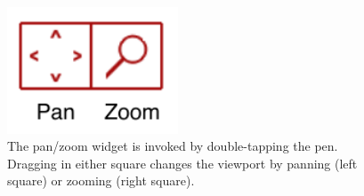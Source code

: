 \begin{figure}
  \centering
  \includegraphics[width=2in]{img/panzoom.pdf}
  \caption[Pan/Zoom Widget]{The pan/zoom widget is invoked by double-tapping the
    pen. Dragging in either square changes the viewport by panning
    (left square) or zooming (right square).}
  \label{fig:panzoom}
\end{figure}
